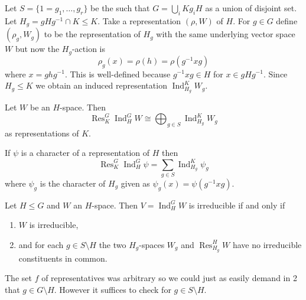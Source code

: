 \documentclass[a4paper]{article}
\DeclareMathOperator{\Res}{Res} %
\DeclareMathOperator{\Ind}{Ind} %
\theoremstyle{definition}
\begin{document}
Let \(S = \{1 = g_1, \dots, g_r\}\) be the such that \(G = \bigcup_i Kg_iH\) as a union of disjoint set. Let \(H_g = gHg^{-1} \cap K \leq K\). Take a representation \((\rho, W)\) of \(H\). For \(g \in G\) define \((\rho_g, W_g)\) to be the representation of \(H_g\) with the same underlying vector space \(W\) but now the \(H_g\)-action is
\[
  \rho_g(x) = \rho(h) = \rho(g^{-1}xg)
\]
where \(x = ghg^{-1}\). This is well-defined because \(g^{-1}xg \in H\) for \(x \in gHg^{-1}\). Since \(H_g \leq K\) we obtain an induced representation \(\Ind_{H_g}^K W_g\).

\begin{theorem}
  \label{thm:Mackey's restriction formula}
  Let \(W\) be an \(H\)-space. Then
  \[
    \Res_K^G \Ind_H^G W \cong \bigoplus_{g\in S} \Ind_{H_g}^K W_g
  \]
  as representations of \(K\).
\end{theorem}

\begin{corollary}
  If \(\psi\) is a character of a representation of \(H\) then
  \[
    \Res_K^G \Ind_H^G \psi = \sum_{g \in S} \Ind_{H_g}^K \psi_g
  \]
  where \(\psi_g\) is the character of \(H_g\) given as \(\psi_g(x) = \psi(g^{-1}xg)\).
\end{corollary}

\begin{corollary}
  \label{cor:Mackey's irreducibility criterion}
  Let \(H \leq G\) and \(W\) an \(H\)-space. Then \(V = \Ind_H^G W\) is irreducible if and only if
  \begin{enumerate}
  \item \(W\) is irreducible,
  \item and for each \(g \in S \setminus H\) the two \(H_g\)-spaces \(W_g\) and \(\Res_{H_g}^H W\) have no irreducible constituents in common.
  \end{enumerate}
\end{corollary}

\begin{remark}
  The set \(f\) of representatives was arbitrary so we could just as easily demand in 2 that \(g \in G \setminus H\). However it suffices to check for \(g \in S \setminus H\).
\end{remark}
\end{document}
